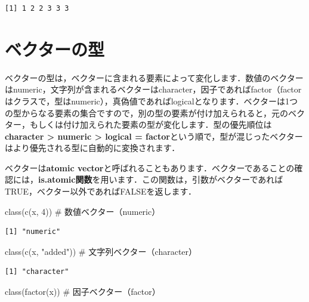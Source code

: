 \documentclass[
  letterpaper,
  DIV=11,
  numbers=noendperiod]{scrreprt}
\newenvironment{Shaded}{\begin{snugshade}}{\end{snugshade}}
\newcommand{\CommentTok}[1]{\textcolor[rgb]{0.37,0.37,0.37}{#1}}
\newcommand{\DecValTok}[1]{\textcolor[rgb]{0.68,0.00,0.00}{#1}}
\newcommand{\FunctionTok}[1]{\textcolor[rgb]{0.28,0.35,0.67}{#1}}
\newcommand{\NormalTok}[1]{\textcolor[rgb]{0.00,0.23,0.31}{#1}}
\newcommand{\StringTok}[1]{\textcolor[rgb]{0.13,0.47,0.30}{#1}}
\begin{document}
\begin{verbatim}
[1] 1 2 2 3 3 3
\end{verbatim}

\hypertarget{ux30d9ux30afux30bfux30fcux306eux578b}{%
\section{ベクターの型}\label{ux30d9ux30afux30bfux30fcux306eux578b}}

ベクターの型は，ベクターに含まれる要素によって変化します．数値のベクターはnumeric，文字列が含まれるベクターはcharacter，因子であればfactor（factorはクラスで，型はnumeric），真偽値であればlogicalとなります．ベクターは1つの型からなる要素の集合ですので，別の型の要素が付け加えられると，元のベクター，もしくは付け加えられた要素の型が変化します．型の優先順位は\textbf{character
\textgreater{} numeric \textgreater{} logical =
factor}という順で，型が混じったベクターはより優先される型に自動的に変換されます．

ベクターは\textbf{atomic
vector}と呼ばれることもあります．ベクターであることの確認には，\textbf{is.atomic関数}を用います．この関数は，引数がベクターであればTRUE，ベクター以外であればFALSEを返します．

\begin{Shaded}
\begin{Highlighting}[]
\FunctionTok{class}\NormalTok{(}\FunctionTok{c}\NormalTok{(x, }\DecValTok{4}\NormalTok{)) }\CommentTok{\# 数値ベクター（numeric）}
\end{Highlighting}
\end{Shaded}

\begin{verbatim}
[1] "numeric"
\end{verbatim}

\begin{Shaded}
\begin{Highlighting}[]
\FunctionTok{class}\NormalTok{(}\FunctionTok{c}\NormalTok{(x, }\StringTok{"added"}\NormalTok{)) }\CommentTok{\# 文字列ベクター（character）}
\end{Highlighting}
\end{Shaded}

\begin{verbatim}
[1] "character"
\end{verbatim}

\begin{Shaded}
\begin{Highlighting}[]
\FunctionTok{class}\NormalTok{(}\FunctionTok{factor}\NormalTok{(x)) }\CommentTok{\# 因子ベクター（factor）}
\end{Highlighting}
\end{Shaded}
\end{document}
